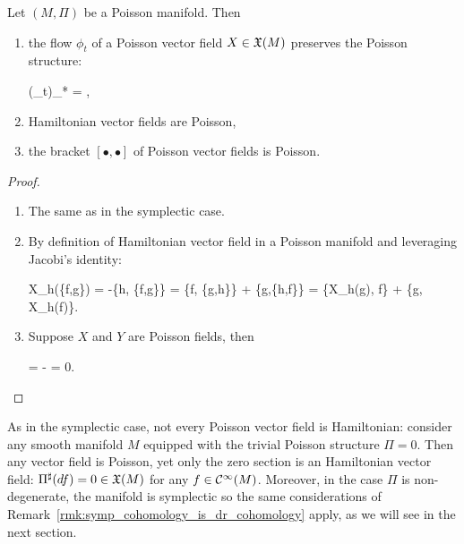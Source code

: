 \documentclass[main.tex]{subfiles}
\begin{document}
\begin{theorem}
	Let $(M,\Pi)$ be a Poisson manifold. Then
	\begin{enumerate}
		\item the flow $\phi_t$ of a Poisson vector field $X \in \mathfrak{X}(M)$ preserves the Poisson structure:
		\begin{eqalign}
			(\phi_t)_* \Pi = \Pi,
		\end{eqalign}
		\item Hamiltonian vector fields are Poisson,
		\item the bracket $[\bullet, \bullet]$ of Poisson vector fields is Poisson.
	\end{enumerate}
\end{theorem}
\begin{proof}
	\leavevmode
	\begin{enumerate}
		\item The same as in the symplectic case.
		\item By definition of Hamiltonian vector field in a Poisson manifold and leveraging Jacobi's identity:
		\begin{eqalign}
			X_h(\{f,g\}) = -\{h, \{f,g\}\} = \{f, \{g,h\}\} + \{g,\{h,f\}\} = \{X_h(g), f\} + \{g, X_h(f)\}.
		\end{eqalign}
		\item Suppose $X$ and $Y$ are Poisson fields, then
		\begin{eqalign}
			\Lie{[X,Y]}\Pi = \Lie{Y}\Pi - \Pi = 0.
		\end{eqalign}
	\end{enumerate}
\end{proof}

\begin{remark}
	As in the symplectic case, not every Poisson vector field is Hamiltonian: consider any smooth manifold $M$ equipped with the trivial Poisson structure $\Pi=0$. Then any vector field is Poisson, yet only the zero section is an Hamiltonian vector field: $\Pi^\sharp(df) = 0 \in \mathfrak{X}(M)$ for any $f \in \mathcal{C}^\infty(M)$. Moreover, in the case $\Pi$ is non-degenerate, the manifold is symplectic so the same considerations of Remark~\ref{rmk:symp_cohomology_is_dr_cohomology} apply, as we will see in the next section.
\end{remark}

\end{document}

